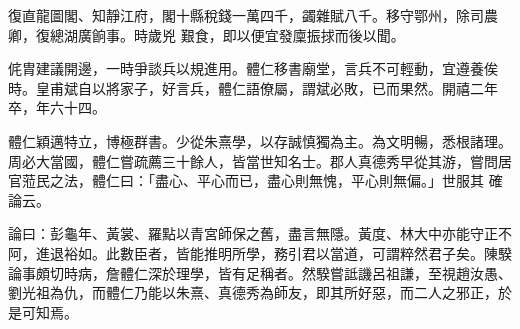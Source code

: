 \begin{pinyinscope}
 復直龍圖閣、知靜江府，閣十縣稅錢一萬四千，蠲雜賦八千。移守鄂州，除司農卿，復總湖廣餉事。時歲兇
 艱食，即以便宜發廩振捄而後以聞。



 侂胄建議開邊，一時爭談兵以規進用。體仁移書廟堂，言兵不可輕動，宜遵養俟時。皇甫斌自以將家子，好言兵，體仁語僚屬，謂斌必敗，已而果然。開禧二年卒，年六十四。



 體仁穎邁特立，博極群書。少從朱熹學，以存誠慎獨為主。為文明暢，悉根諸理。周必大當國，體仁嘗疏薦三十餘人，皆當世知名士。郡人真德秀早從其游，嘗問居官蒞民之法，體仁曰：「盡心、平心而已，盡心則無愧，平心則無偏。」世服其
 確論云。



 論曰：彭龜年、黃裳、羅點以青宮師保之舊，盡言無隱。黃度、林大中亦能守正不阿，進退裕如。此數臣者，皆能推明所學，務引君以當道，可謂粹然君子矣。陳騤論事頗切時病，詹體仁深於理學，皆有足稱者。然騤嘗詆譏呂祖謙，至視趙汝愚、劉光祖為仇，而體仁乃能以朱熹、真德秀為師友，即其所好惡，而二人之邪正，於是可知焉。



\end{pinyinscope}